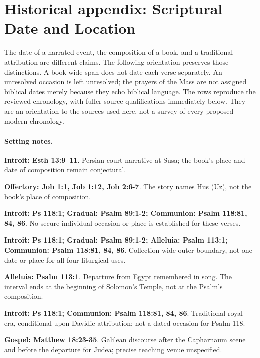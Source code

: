 \section{Historical appendix: Scriptural Date and Location}
\label{historical-appendix}

The date of a narrated event, the composition of a book, and a traditional
attribution are different claims. The following orientation preserves those
distinctions. A book-wide span does not date each verse separately. An
unresolved occasion is left unresolved; the prayers of the Mass are not
assigned biblical dates merely because they echo biblical language. The
rows reproduce the reviewed chronology, with fuller source qualifications
immediately below. They are an orientation to the sources used here, not a
survey of every proposed modern chronology.



\paragraph{Setting notes.}
\noindent\textbf{Introit: Esth 13:9--11}. Persian court narrative at Susa; the book's place and date of composition remain conjectural.

\noindent\textbf{Offertory: Job 1:1, Job 1:12, Job 2:6-7}. The story names Hus (Uz), not the book's place of composition.

\noindent\textbf{Introit: Ps 118:1; Gradual: Psalm 89:1-2; Communion: Psalm 118:81, 84, 86}. No secure individual occasion or place is established for these verses.

\noindent\textbf{Introit: Ps 118:1; Gradual: Psalm 89:1-2; Alleluia: Psalm 113:1; Communion: Psalm 118:81, 84, 86}. Collection-wide outer boundary, not one date or place for all four liturgical uses.

\noindent\textbf{Alleluia: Psalm 113:1}. Departure from Egypt remembered in song. The interval ends at the beginning of Solomon's Temple, not at the Psalm's composition.

\noindent\textbf{Introit: Ps 118:1; Communion: Psalm 118:81, 84, 86}. Traditional royal era, conditional upon Davidic attribution; not a dated occasion for Psalm 118.

\noindent\textbf{Gospel: Matthew 18:23-35}. Galilean discourse after the Capharnaum scene and before the departure for Judea; precise teaching venue unspecified.


